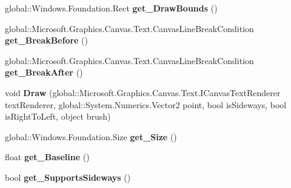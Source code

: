 \begin{DoxyCompactItemize}
global\+::\+Windows.\+Foundation.\+Rect {\bfseries get\+\_\+\+Draw\+Bounds} ()
\item 
\mbox{\label{interface_microsoft_1_1_graphics_1_1_canvas_1_1_text_1_1_i_canvas_text_inline_object_ab4d7471230758ba37f78405c4601e84c}} 
global\+::\+Microsoft.\+Graphics.\+Canvas.\+Text.\+Canvas\+Line\+Break\+Condition {\bfseries get\+\_\+\+Break\+Before} ()
\item 
\mbox{\label{interface_microsoft_1_1_graphics_1_1_canvas_1_1_text_1_1_i_canvas_text_inline_object_a4448b603d3b5124efb75f573cbb18a73}} 
global\+::\+Microsoft.\+Graphics.\+Canvas.\+Text.\+Canvas\+Line\+Break\+Condition {\bfseries get\+\_\+\+Break\+After} ()
\item 
\mbox{\label{interface_microsoft_1_1_graphics_1_1_canvas_1_1_text_1_1_i_canvas_text_inline_object_a00030cc74b4e29c52023687b4c2c3dc8}} 
void {\bfseries Draw} (global\+::\+Microsoft.\+Graphics.\+Canvas.\+Text.\+I\+Canvas\+Text\+Renderer text\+Renderer, global\+::\+System.\+Numerics.\+Vector2 point, bool is\+Sideways, bool is\+Right\+To\+Left, object brush)
\item 
\mbox{\label{interface_microsoft_1_1_graphics_1_1_canvas_1_1_text_1_1_i_canvas_text_inline_object_abdd46513229ae92a984fb38a29523eee}} 
global\+::\+Windows.\+Foundation.\+Size {\bfseries get\+\_\+\+Size} ()
\item 
\mbox{\label{interface_microsoft_1_1_graphics_1_1_canvas_1_1_text_1_1_i_canvas_text_inline_object_a60131c69d543427c072b80153dd7e4e9}} 
float {\bfseries get\+\_\+\+Baseline} ()
\item 
\mbox{\label{interface_microsoft_1_1_graphics_1_1_canvas_1_1_text_1_1_i_canvas_text_inline_object_a3b2557805b6f07e4b21599ebae515270}} 
bool {\bfseries get\+\_\+\+Supports\+Sideways} ()
\item 

\end{DoxyCompactItemize}
